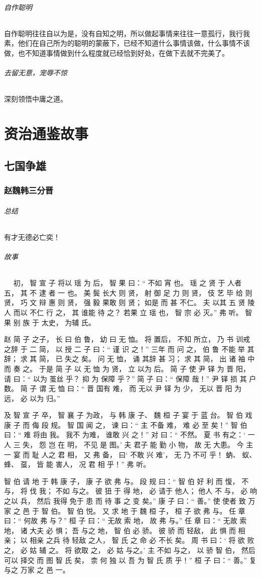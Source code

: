 \documentclass[UTF8,a4paper,8pt]{ctexbook}
\begin{document}
				
				\subparagraph{自作聪明} 自作聪明往往自以为是，没有自知之明，所以做起事情来往往一意孤行，我行我素，他们在自己所为的聪明的蒙蔽下，已经不知道什么事情该做，什么事情不该做，也不知道事情做到什么程度就已经恰到好处，在做下去就不完美了。
				
				\subparagraph{去留无意，宠辱不惊}深刻领悟中庸之道。	
\chapter{资治通鉴故事}
	\section{七国争雄}
		\subsection{赵魏韩三分晋}
			\subparagraph{总结}有才无德必亡奕！
			
			\subparagraph{故事}
				　 初， 智 宣 子 将以 瑶 为 后， 智 果 曰：“ 不如 宵 也。 瑶 之 贤 于 人者 五， 其 不 逮 者 一 也。 美 鬓 长大 则 贤， 射 御 足 力 则 贤， 伎 艺 毕 给 则 贤， 巧 文 辩 惠 则 贤， 强 毅 果敢 则 贤； 如是 而 甚 不仁。 夫 以其 五 贤 陵 人 而以 不仁 行 之， 其 谁能 待 之？ 若果 立 瑶 也， 智 宗 必 灭。” 弗 听。 智 果 别 族 于 太史， 为辅 氏。
				
				  赵 简 子 之子， 长 曰 伯 鲁， 幼 曰 无 恤。 将 置后， 不知 所立， 乃 书 训戒 之辞 于 二 简， 以 授 二 子 曰：“ 谨 识 之！” 三年 而 问 之， 伯 鲁 不能 举 其辞； 求 其 简， 已 失之 矣。 问 无 恤， 诵 其辞 甚 习； 求 其 简， 出 诸 袖 中 而 奏 之。 于是 简 子 以 无 恤 为 贤， 立 以为 后。 简 子 使 尹 铎 为 晋 阳， 请 曰：“ 以为 茧丝 乎？ 抑 为 保障 乎？” 简 子 曰：“ 保障 哉！” 尹 铎 损 其 户数。 简 子 谓 无 恤 曰：“ 晋 国有 难， 而 无以 尹 铎 为 少， 无以 晋 阳 为 远， 必 以为 归。” 
				  
				  及 智 宣 子 卒， 智 襄 子 为政， 与 韩 康 子、 魏 桓 子 宴 于 蓝 台。 智 伯 戏 康 子 而 侮 段 规。 智 国 闻 之， 谏 曰：“ 主 不备 难， 难 必 至 矣！” 智 伯 曰：“ 难 将由 我。 我不 为难， 谁敢 兴 之！” 对 曰：“ 不然。 夏 书 有之：‘ 一人 三 失， 怨 岂 在 明， 不见 是 图。’ 夫 君子 能 勤 小 物， 故 无 大患。 今 主 一 宴 而 耻 人之 君 相， 又 弗 备， 曰‘ 不敢 兴 难’， 无 乃 不可 乎！ 蚋、 蚁、 蜂、 虿， 皆 能 害人， 况 君 相 乎！” 弗 听。 
				  
				  智 伯 请 地 于 韩 康 子， 康 子 欲 弗 与。 段 规 曰：“ 智 伯 好 利 而 愎， 不 与， 将 伐 我； 不如 与之。 彼 狃 于 得 地， 必 请于 他人； 他人 不 与， 必 响 之以 兵， 然后 我得 免于 患 而 待 事 之 变 矣。” 康 子 曰：“ 善。” 使 使者 致 万家 之 邑 于 智 伯。 智 伯 悦。 又 求 地 于 魏 桓 子， 桓 子 欲 弗 与。 任 章 曰：“ 何故 弗 与？” 桓 子 曰：“ 无故 索 地， 故 弗 与。” 任 章 曰：“ 无故 索 地， 诸 大夫 必 惧； 吾 与之 地， 智 伯 必 骄。 彼 骄 而 轻敌， 此 惧 而 相亲； 以 相亲 之兵 待 轻敌 之人， 智 氏 之 命 必 不长 矣。 周 书 曰：‘ 将 欲 败 之， 必 姑 辅 之。 将 欲取 之， 必 姑 与之。’ 主 不如 与之， 以 骄 智 伯， 然后 可以 择交 而 图 智 氏 矣， 柰 何 独 以 吾 为 智 氏 质 乎！” 桓 子 曰：“ 善。” 复 与之 万家 之 邑 一。 
				  
\end{document}
